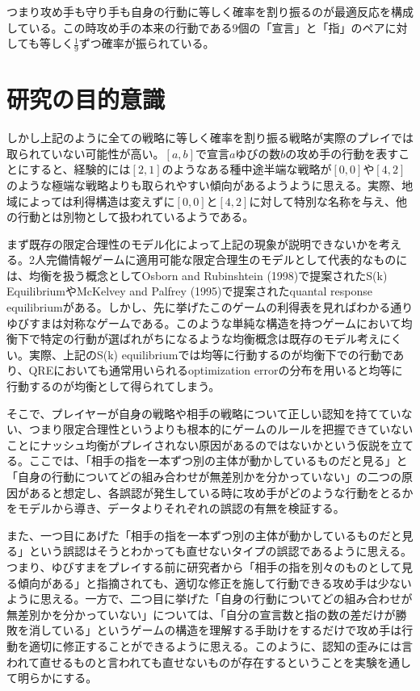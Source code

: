 \documentclass{jsarticle}
\begin{document}
つまり攻め手も守り手も自身の行動に等しく確率を割り振るのが最適反応を構成している。この時攻め手の本来の行動である$9$個の「宣言」と「指」のペアに対しても等しく$\frac{1}{9}$ずつ確率が振られている。

\section{研究の目的意識}
しかし上記のように全ての戦略に等しく確率を割り振る戦略が実際のプレイでは取られていない可能性が高い。$[a,b]$で宣言$a$ゆびの数$b$の攻め手の行動を表すことにすると、経験的には$[2,1]$のようなある種中途半端な戦略が$[0,0]$や$[4,2]$のような極端な戦略よりも取られやすい傾向があるようように思える。実際、地域によっては利得構造は変えずに$[0,0]$と$[4,2]$に対して特別な名称を与え、他の行動とは別物として扱われているようである。

まず既存の限定合理性のモデル化によって上記の現象が説明できないかを考える。2人完備情報ゲームに適用可能な限定合理生のモデルとして代表的なものには、均衡を扱う概念としてOsborn and Rubinshtein (1998)で提案されたS(k) EquilibriumやMcKelvey and Palfrey (1995)で提案されたquantal response equilibriumがある。しかし、先に挙げたこのゲームの利得表を見ればわかる通りゆびすまは対称なゲームである。このような単純な構造を持つゲームにおいて均衡下で特定の行動が選ばれがちになるような均衡概念は既存のモデル考えにくい。実際、上記のS(k) equilibriumでは均等に行動するのが均衡下での行動であり、QREにおいても通常用いられるoptimization errorの分布を用いると均等に行動するのが均衡として得られてしまう。

そこで、プレイヤーが自身の戦略や相手の戦略について正しい認知を持てていない、つまり限定合理性というよりも根本的にゲームのルールを把握できていないことにナッシュ均衡がプレイされない原因があるのではないかという仮説を立てる。ここでは、「相手の指を一本ずつ別の主体が動かしているものだと見る」と「自身の行動についてどの組み合わせが無差別かを分かっていない」の二つの原因があると想定し、各誤認が発生している時に攻め手がどのような行動をとるかをモデルから導き、データよりそれぞれの誤認の有無を検証する。

また、一つ目にあげた「相手の指を一本ずつ別の主体が動かしているものだと見る」という誤認はそうとわかっても直せないタイプの誤認であるように思える。つまり、ゆびすまをプレイする前に研究者から「相手の指を別々のものとして見る傾向がある」と指摘されても、適切な修正を施して行動できる攻め手は少ないように思える。一方で、二つ目に挙げた「自身の行動についてどの組み合わせが無差別かを分かっていない」については、「自分の宣言数と指の数の差だけが勝敗を消している」というゲームの構造を理解する手助けをするだけで攻め手は行動を適切に修正することができるように思える。このように、認知の歪みには言われて直せるものと言われても直せないものが存在するということを実験を通して明らかにする。
\end{document}
